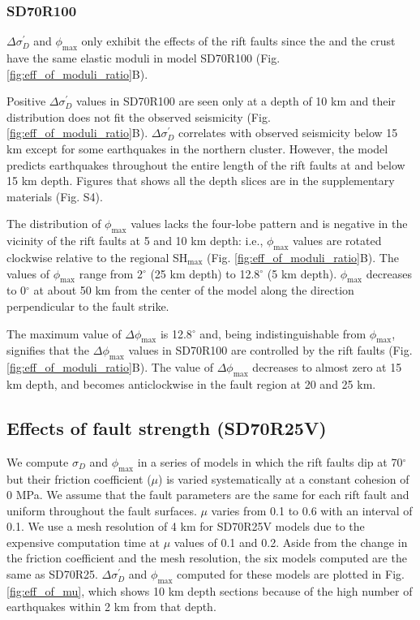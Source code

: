 \documentclass[draft]{agujournal2018}
\begin{document}
\subsubsection{SD70R100}
$\Delta\sigma_{D}^{\prime}$ and $\phi_{\max}$ only exhibit the effects of the rift faults since the  and the crust have the same elastic moduli in model SD70R100 (Fig. \ref{fig:eff_of_moduli_ratio}B).

Positive $\Delta\sigma_{D}^{\prime}$ values in SD70R100 are seen only at a depth of 10 km and their distribution does not fit the observed seismicity (Fig. \ref{fig:eff_of_moduli_ratio}B).   $\Delta\sigma_{D}^{\prime}$ correlates with observed seismicity below 15 km except for some earthquakes in the northern cluster. However, the model predicts earthquakes throughout the entire length of the rift faults at and below 15 km depth. Figures that shows all the depth slices are in the supplementary materials (Fig. S4). 

The distribution of $\phi_{\max}$ values lacks the four-lobe pattern and is negative in the vicinity of the rift faults at 5 and 10 km depth: i.e., $\phi_{\max}$ values are rotated clockwise relative to the regional SH$_{\max}$ (Fig. \ref{fig:eff_of_moduli_ratio}B). The values of $\phi_{\max}$ range from 2$^\circ$ (25 km depth) to 12.8$^\circ$ (5 km depth). $\phi_{\max}$ decreases to 0$^{\circ}$ at about 50 km from the center of the model along the direction perpendicular to the fault strike.

The maximum value of $\Delta\phi_{\max}$ is 12.8$^\circ$ and, being indistinguishable from $\phi_{\max}$, signifies that the  $\Delta\phi_{\max}$ values in SD70R100 are controlled by the rift faults (Fig. \ref{fig:eff_of_moduli_ratio}B). The value of $\Delta\phi_{\max}$ decreases to almost zero at 15 km depth, and becomes anticlockwise in the fault region at 20 and 25 km.

\subsection{Effects of fault strength (SD70R25V)}
We compute $\sigma_{D}$ and $\phi_{\max}$ in a series of models in which the rift faults dip at 70$^{\circ}$ but their friction coefficient ($\mu$) is varied systematically at a constant cohesion of 0 MPa. We assume that the fault parameters are the same for each rift fault and uniform throughout the fault surfaces. $\mu$ varies from 0.1 to 0.6 with an interval of 0.1. We use a mesh resolution of 4 km for SD70R25V models due to the expensive computation time at $\mu$ values of 0.1 and 0.2. Aside from the change in the friction coefficient and the mesh resolution, the six models computed are the same as SD70R25. $\Delta \sigma_{D}^{\prime}$ and $\phi_{\max}$ computed for these models are plotted in Fig. \ref{fig:eff_of_mu}, which shows 10 km depth sections because of the high number of earthquakes within 2 km from that depth.
\end{document}
